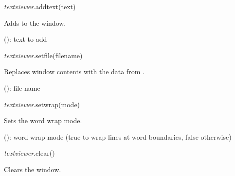 \documentclass[a4paper,12pt,twoside,extrafontsizes]{memoir}
\begin{document}

\begin{luafuncprototype}
\emph{textviewer}.addtext(text)
\end{luafuncprototype}

\begin{funcdescr}
	Adds  to the window.
\end{funcdescr}

\begin{funcparams}
	 (): text to add
\end{funcparams}


\begin{luafuncprototype}
\emph{textviewer}.setfile(filename)
\end{luafuncprototype}

\begin{funcdescr}
	Replaces window contents with the data from .
\end{funcdescr}

\begin{funcparams}
	 (): file name
\end{funcparams}


\begin{luafuncprototype}
\emph{textviewer}.setwrap(mode)
\end{luafuncprototype}

\begin{funcdescr}
	Sets the word wrap mode.
\end{funcdescr}

\begin{funcparams}
	 (): word wrap mode (true to wrap lines at word boundaries, false otherwise)
\end{funcparams}


\begin{luafuncprototype}
\emph{textviewer}.clear()
\end{luafuncprototype}

\begin{funcdescr}
	Clears the window.
\end{funcdescr}
\end{document}
